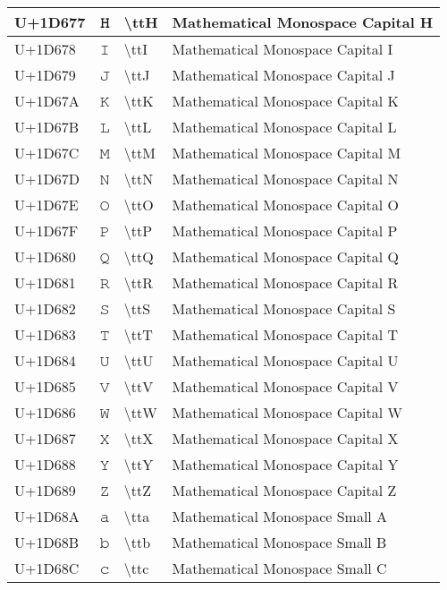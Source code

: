 \begin{table}[h]
\begin{tabulary}{\linewidth}{|L|L|L|L|}
\hline
U+1D677 & 𝙷 & {\textbackslash}ttH & Mathematical Monospace Capital H \\
\hline
U+1D678 & 𝙸 & {\textbackslash}ttI & Mathematical Monospace Capital I \\
\hline
U+1D679 & 𝙹 & {\textbackslash}ttJ & Mathematical Monospace Capital J \\
\hline
U+1D67A & 𝙺 & {\textbackslash}ttK & Mathematical Monospace Capital K \\
\hline
U+1D67B & 𝙻 & {\textbackslash}ttL & Mathematical Monospace Capital L \\
\hline
U+1D67C & 𝙼 & {\textbackslash}ttM & Mathematical Monospace Capital M \\
\hline
U+1D67D & 𝙽 & {\textbackslash}ttN & Mathematical Monospace Capital N \\
\hline
U+1D67E & 𝙾 & {\textbackslash}ttO & Mathematical Monospace Capital O \\
\hline
U+1D67F & 𝙿 & {\textbackslash}ttP & Mathematical Monospace Capital P \\
\hline
U+1D680 & 𝚀 & {\textbackslash}ttQ & Mathematical Monospace Capital Q \\
\hline
U+1D681 & 𝚁 & {\textbackslash}ttR & Mathematical Monospace Capital R \\
\hline
U+1D682 & 𝚂 & {\textbackslash}ttS & Mathematical Monospace Capital S \\
\hline
U+1D683 & 𝚃 & {\textbackslash}ttT & Mathematical Monospace Capital T \\
\hline
U+1D684 & 𝚄 & {\textbackslash}ttU & Mathematical Monospace Capital U \\
\hline
U+1D685 & 𝚅 & {\textbackslash}ttV & Mathematical Monospace Capital V \\
\hline
U+1D686 & 𝚆 & {\textbackslash}ttW & Mathematical Monospace Capital W \\
\hline
U+1D687 & 𝚇 & {\textbackslash}ttX & Mathematical Monospace Capital X \\
\hline
U+1D688 & 𝚈 & {\textbackslash}ttY & Mathematical Monospace Capital Y \\
\hline
U+1D689 & 𝚉 & {\textbackslash}ttZ & Mathematical Monospace Capital Z \\
\hline
U+1D68A & 𝚊 & {\textbackslash}tta & Mathematical Monospace Small A \\
\hline
U+1D68B & 𝚋 & {\textbackslash}ttb & Mathematical Monospace Small B \\
\hline
U+1D68C & 𝚌 & {\textbackslash}ttc & Mathematical Monospace Small C \\

\end{tabulary}
\end{table}
